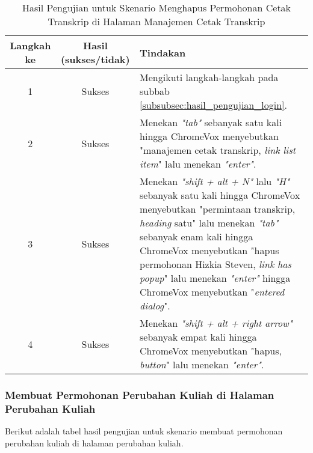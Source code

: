 \begin{table}[H]
    \centering 
    \caption{Hasil Pengujian untuk Skenario Menghapus Permohonan Cetak Transkrip di Halaman Manajemen Cetak Transkrip}
    \label{tab:hasil_pengujian_menghapus_permohonan_cetak_transkrip_di_halaman_manajemen_cetak_transkrip}
    \begin{tabular}{|c|c|p{10cm}|}
        \toprule
        Langkah ke & Hasil (sukses/tidak) & Tindakan \\

        \midrule
        1 & Sukses & Mengikuti langkah-langkah pada subbab \ref{subsubsec:hasil_pengujian_login}. \\
        2 & Sukses & Menekan \textit{"tab"} sebanyak satu kali hingga ChromeVox menyebutkan "manajemen cetak transkrip, \textit{link list item}" lalu menekan \textit{"enter"}. \\
        3 & Sukses & Menekan \textit{"shift + alt + N"} lalu \textit{"H"} sebanyak satu kali hingga ChromeVox menyebutkan "permintaan transkrip, \textit{heading} satu" lalu menekan \textit{"tab"} sebanyak enam kali hingga ChromeVox menyebutkan "hapus permohonan Hizkia Steven, \textit{link has popup}" lalu menekan \textit{"enter"} hingga ChromeVox menyebutkan "\textit{entered dialog}". \\
        4 & Sukses & Menekan \textit{"shift + alt + right arrow"} sebanyak empat kali hingga ChromeVox menyebutkan "hapus, \textit{button}" lalu menekan \textit{"enter"}. \\ 

        \bottomrule

    \end{tabular}
\end{table}

\subsubsection{Membuat Permohonan Perubahan Kuliah di Halaman Perubahan Kuliah}
\label{subsubsec:hasil_pengujian_membuat_permohonan_perubahan_kuliah_di_halaman_perubahan_kuliah}
Berikut adalah tabel hasil pengujian untuk skenario membuat permohonan perubahan kuliah di halaman perubahan kuliah.

